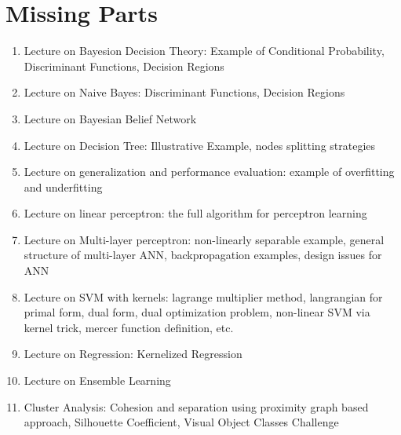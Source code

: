 \chapter{Missing Parts}

\begin{enumerate}
    \item Lecture on Bayesion Decision Theory: Example of Conditional Probability, Discriminant Functions, Decision Regions
    \item Lecture on Naive Bayes: Discriminant Functions, Decision Regions
    \item Lecture on Bayesian Belief Network
    \item Lecture on Decision Tree: Illustrative Example, nodes splitting strategies
    \item Lecture on generalization and performance evaluation: example of overfitting and underfitting 
    \item Lecture on linear perceptron: the full algorithm for perceptron learning
    \item Lecture on Multi-layer perceptron: non-linearly separable example, general structure of multi-layer ANN, backpropagation examples, design issues for ANN
    \item Lecture on SVM with kernels: lagrange multiplier method, langrangian for primal form, dual form, dual optimization problem, non-linear SVM via kernel trick, mercer function definition, etc.
    \item Lecture on Regression: Kernelized Regression
    \item Lecture on Ensemble Learning
    \item Cluster Analysis: Cohesion and separation using proximity graph based approach, Silhouette Coefficient, Visual Object Classes Challenge
\end{enumerate}